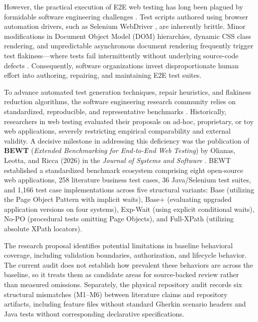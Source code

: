 \documentclass[pdflatex,sn-mathphys-num]{sn-jnl}
\begin{document}
However, the practical execution of E2E web testing has long been plagued by formidable software engineering challenges \cite{leotta2018repairing}. Test scripts authored using browser automation drivers, such as Selenium WebDriver \cite{selenium2024}, are inherently brittle. Minor modifications in Document Object Model (DOM) hierarchies, dynamic CSS class rendering, and unpredictable asynchronous document rendering frequently trigger test flakiness---where tests fail intermittently without underlying source-code defects \cite{luo2014empirical, yandrapally2020robust}. Consequently, software organizations invest disproportionate human effort into authoring, repairing, and maintaining E2E test suites.

To advance automated test generation techniques, repair heuristics, and flakiness reduction algorithms, the software engineering research community relies on standardized, reproducible, and representative benchmarks \cite{sim2003benchmark}. Historically, researchers in web testing evaluated their proposals on ad-hoc, proprietary, or toy web applications, severely restricting empirical comparability and external validity. A decisive milestone in addressing this deficiency was the publication of \textbf{BEWT} (\textit{Extended Benchmarking for End-to-End Web Testing}) by Olianas, Leotta, and Ricca (2026) in the \textit{Journal of Systems and Software} \cite{olianas2026bewt}. BEWT established a standardized benchmark ecosystem comprising eight open-source web applications, 258 literature business test cases, 36 Java/Selenium test suites, and 1,166 test case implementations across five structural variants: Base (utilizing the Page Object Pattern with implicit waits), Base+ (evaluating upgraded application versions on four systems), Exp-Wait (using explicit conditional waits), No-PO (procedural tests omitting Page Objects), and Full-XPath (utilizing absolute XPath locators).

The research proposal identifies potential limitations in baseline behavioral coverage, including validation boundaries, authorization, and lifecycle behavior. The current audit does not establish how prevalent these behaviors are across the baseline, so it treats them as candidate areas for source-backed review rather than measured omissions. Separately, the physical repository audit records six structural mismatches (M1--M6) between literature claims and repository artifacts, including feature files without standard Gherkin scenario headers and Java tests without corresponding declarative specifications.
\end{document}
